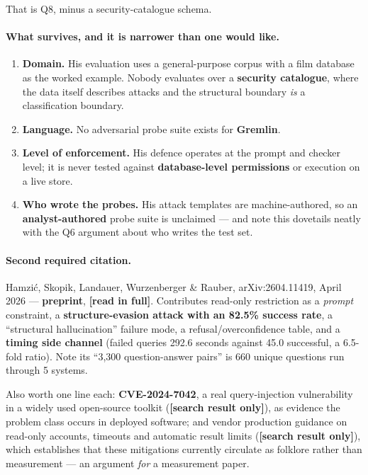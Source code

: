 \documentclass[11pt,a4paper]{article}
\newcommand{\readtag}{\textcolor{standing}{\textbf{[read in full]}}}
\newcommand{\sniptag}{\textcolor{killed}{\textbf{[search result only]}}}
\begin{document}
That is Q8, minus a security-catalogue schema.

\paragraph{What survives, and it is narrower than one would like.}

\begin{enumerate}
\item \textbf{Domain.} His evaluation uses a general-purpose corpus with a film
      database as the worked example. Nobody evaluates over a \textbf{security
      catalogue}, where the data itself describes attacks and the structural boundary
      \emph{is} a classification boundary.
\item \textbf{Language.} No adversarial probe suite exists for \textbf{Gremlin}.
\item \textbf{Level of enforcement.} His defence operates at the prompt and checker
      level; it is never tested against \textbf{database-level permissions} or
      execution on a live store.
\item \textbf{Who wrote the probes.} His attack templates are machine-authored, so an
      \textbf{analyst-authored} probe suite is unclaimed --- and note this dovetails
      neatly with the Q6 argument about who writes the test set.
\end{enumerate}

\paragraph{Second required citation.} Hamzić, Skopik, Landauer, Wurzenberger \&
Rauber, arXiv:2604.11419, April 2026 --- \textbf{preprint}, \readtag. Contributes
read-only restriction as a \emph{prompt} constraint, a \textbf{structure-evasion
attack with an 82.5\% success rate}, a ``structural hallucination'' failure mode,
a refusal/overconfidence table, and a \textbf{timing side channel} (failed queries
292.6 seconds against 45.0 successful, a 6.5-fold ratio). Note its ``3{,}300
question-answer pairs'' is 660 unique questions run through 5 systems.

Also worth one line each: \textbf{CVE-2024-7042}, a real query-injection
vulnerability in a widely used open-source toolkit (\sniptag), as evidence the
problem class occurs in deployed software; and vendor production guidance on
read-only accounts, timeouts and automatic result limits (\sniptag), which
establishes that these mitigations currently circulate as folklore rather than
measurement --- an argument \emph{for} a measurement paper.
\end{document}
